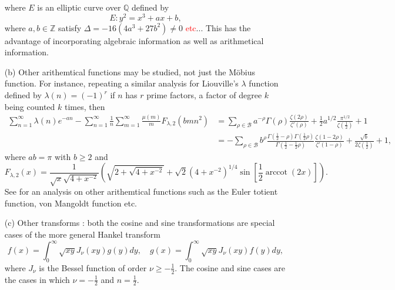 \documentclass[11pt]{article}
\newcommand{\Z}{\mathbb{Z}}
\newcommand{\Q}{\mathbb{Q}}
\numberwithin{equation}{section}		 			%
\numberwithin{figure}{section}			 			%
\begin{document}
\begin{enumerate}
where $E$ is an elliptic curve over $\Q$ defined by
\[E:{y^2} = {x^3} + ax + b,\]
where $a,b \in \Z$ satisfy $\Delta = -16(4a^3+27b^2) \ne 0$ \textcolor{red}{etc}... This has the advantage of incorporating algebraic information as well as arithmetical information.
\item[(b)] Other arithemtical functions may be studied, not just the M\"{o}bius function. For instance, repeating a similar analysis for Liouville's $\lambda$ function defined by $\lambda(n)=(-1)^{r}$ if $n$ has $r$ prime factors, a factor of degree $k$ being counted $k$ times, then
\begin{align}
\sum\limits_{n = 1}^\infty  {\lambda (n)e^{ - an} }  - \sum\limits_{n = 1}^\infty  {\frac{1}
{n}\sum\limits_{m = 1}^\infty  {\frac{{\mu (m)}}
{m}} F_{\lambda,2}  (bmn^2)}  &= \sum\limits_{\rho \in \mathcal{B}}  {a^{ - \rho } \Gamma (\rho )\frac{{\zeta (2\rho )}}
{{\zeta '(\rho )}}}  + \frac{1}
{2}a^{1/2} \frac{{\pi ^{1/2} }}
{{\zeta (\tfrac{1}
{2})}} + 1 \nonumber \\
& = - \sum\limits_{\rho \in \mathcal{B}}  {b^\rho  \frac{{\Gamma (\tfrac{1}
{2} - \rho )\Gamma (\tfrac{1}
{2}\rho )}}
{{\Gamma (\tfrac{1}
{2} - \tfrac{1}
{2}\rho )}}\frac{{\zeta (1 - 2\rho )}}
{{\zeta '(1 - \rho )}}} + \frac{\sqrt{b}}{2\zeta(\tfrac{1}{2})} +1, \nonumber
\end{align}
where $ab = \pi$ with $b \ge 2$ and 
\[
F_{\lambda ,2} (x) = \frac{1}
{{\sqrt x \sqrt {4 + x^{ - 2} } }}\left( {\sqrt {2 + \sqrt {4 + x^{ - 2} } }  + \sqrt 2 (4 + x^{ - 2} )^{1/4} \sin \left[ {\frac{1}
{2}\operatorname{arccot} (2x)} \right]} \right).
\]
See \cite{kuhnrobles2} for an analysis on other arithemtical functions such as the Euler totient function, von Mangoldt function etc.
\item[(c)] Other transforms \cite{hardy_titchmarsh}: both the cosine and sine transformations are special cases of the more general Hankel transform
\[f(x) = \int_0^\infty  {\sqrt {xy} {J_\nu }(xy)g(y)dy} ,\quad g(x) = \int_0^\infty  {\sqrt {xy} {J_\nu }(xy)f(y)dy}, \]
where ${J_\nu }$ is the Bessel function of order $\nu \ge -\tfrac{1}{2}$. The cosine and sine cases are the cases in which $\nu = -\tfrac{1}{2}$ and $n = \tfrac{1}{2}$.
\end{enumerate}
\end{document}
